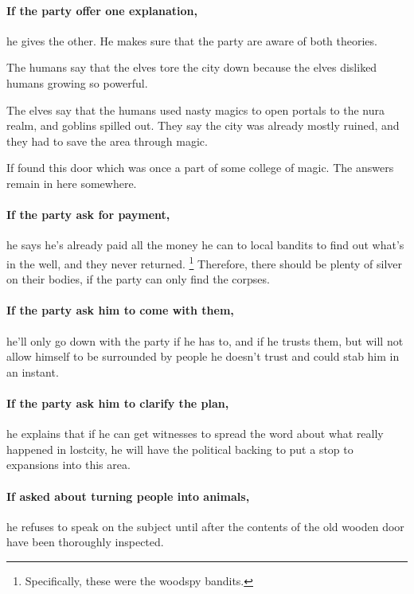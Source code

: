 \begin{multicols}{2}
\paragraph{If the party offer one explanation,}
he gives the other.
He makes sure that the party are aware of both theories.

\begin{speechtext}

	The humans say that the elves tore the city down because the elves disliked humans growing so powerful.

	The elves say that the humans used nasty magics to open portals to the nura realm, and goblins spilled out.
	They say the city was already mostly ruined, and they had to save the area through magic.

	If found this door which was once a part of some college of magic.
	The answers remain in here somewhere.

\end{speechtext}

\paragraph{If the party ask for payment,}
he says he's already paid all the money he can to local bandits to find out what's in the well, and they never returned.%
\footnote{Specifically, these were the woodspy bandits.}
Therefore, there should be plenty of silver on their bodies, if the party can only find the corpses.

\paragraph{If the party ask him to come with them,}
he'll only go down with the party if he has to, and if he trusts them, but will not allow himself to be surrounded by people he doesn't trust and could stab him in an instant.

\paragraph{If the party ask him to clarify the plan,}
he explains that if he can get witnesses to spread the word about what really happened in \gls{lostcity}, he will have the political backing to put a stop to expansions into this area.

\paragraph{If asked about turning people into animals,}
he refuses to speak on the subject until after the contents of the old wooden door have been thoroughly inspected.


\end{multicols}
